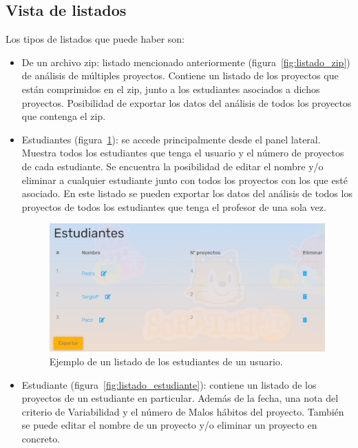 \documentclass[a4paper, 12pt]{book}
\begin{document}
\newpage
\subsection{Vista de listados}
\label{subsec:Vista de listados}

\vspace{5mm}
Los tipos de listados que puede haber son:
\begin{itemize}
    \item De un archivo zip: listado mencionado anteriormente (figura~\ref{fig:listado_zip}) de análisis de múltiples proyectos.
    Contiene un listado de los proyectos que están comprimidos en el zip, junto a los estudiantes asociados a dichos proyectos.
    Posibilidad de exportar los datos del análisis de todos los proyectos que contenga el zip.
    \item Estudiantes (figura~\ref{fig:listado_estudiantes}): se accede principalmente desde el panel lateral.
    Muestra todos los estudiantes que tenga el usuario y el número de proyectos de cada estudiante.
    Se encuentra la posibilidad de editar el nombre y/o eliminar a cualquier estudiante junto con todos los proyectos con los que esté asociado.
    En este listado se pueden exportar los datos del análisis de todos los proyectos de todos los estudiantes que tenga el profesor de una sola vez.
    \begin{figure}[H]
      \centering
      \includegraphics[width=16cm, keepaspectratio]{img/listado_estudiantes.png}
      \caption{Ejemplo de un listado de los estudiantes de un usuario.}\label{fig:listado_estudiantes}
    \end{figure}
    \item Estudiante (figura~\ref{fig:listado_estudiante}): contiene un listado de los proyectos de un estudiante en particular.
    Además de la fecha, una nota del criterio de Variabilidad y el número de Malos hábitos del proyecto.
    También se puede editar el nombre de un proyecto y/o eliminar un proyecto en concreto.

\end{itemize}
\end{document}
